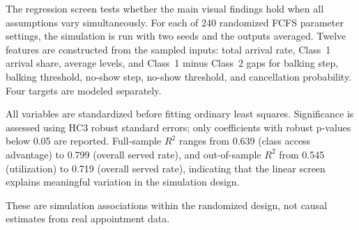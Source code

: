 \documentclass[11pt]{article}
\begin{document}
The regression screen tests whether the main visual findings hold when all
assumptions vary simultaneously. For each of 240 randomized FCFS parameter
settings, the simulation is run with two seeds and the outputs averaged.
Twelve features are constructed from the sampled inputs: total arrival rate,
Class~1 arrival share, average levels, and Class~1 minus Class~2 gaps for
balking step, balking threshold, no-show step, no-show threshold, and
cancellation probability. Four targets are modeled separately.

All variables are standardized before fitting ordinary least squares.
Significance is assessed using HC3 robust standard errors; only coefficients
with robust p-values below 0.05 are reported. Full-sample $R^2$ ranges from
0.639 (class access advantage) to 0.799 (overall served rate), and
out-of-sample $R^2$ from 0.545 (utilization) to 0.719 (overall served rate),
indicating that the linear screen explains meaningful variation in the
simulation design.

These are simulation associations within the randomized design, not
causal estimates from real appointment data.
\end{document}
